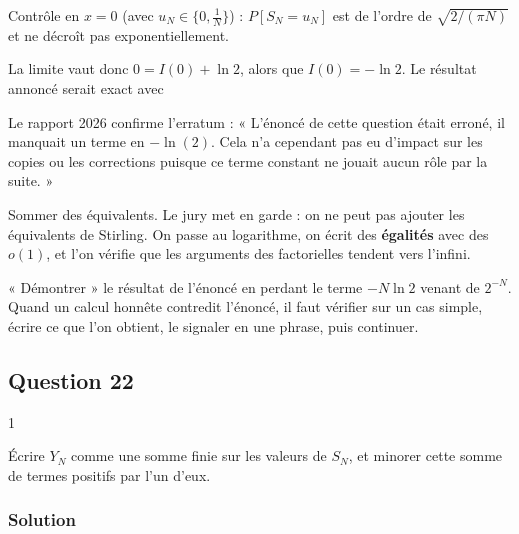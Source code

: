 \documentclass[11pt,a4paper]{article}
\newcommand{\equationajustee}[1]{%
  \sbox{\boiteequation}{$\displaystyle #1$}%
  \ifdim\wd\boiteequation>\linewidth
    \[\resizebox{\linewidth}{!}{\usebox{\boiteequation}}\]%
  \else
    \[#1\]%
  \fi}
\begin{document}
Contrôle en \(x=0\) (avec \(u_N\in\{0,\frac1N\}\)) : \(P[S_N=u_N]\) est de l'ordre de \(\sqrt{2/(\pi N)}\) et ne décroît pas exponentiellement.

La limite vaut donc \(0=I(0)+\ln2\), alors que \(I(0)=-\ln2\). Le résultat annoncé serait exact avec
\equationajustee{J(x)=I(x)+\ln2=\frac{1+x}2\ln(1+x)+\frac{1-x}2\ln(1-x).}

\begin{jury}

Le rapport 2026 confirme l'erratum : « L'énoncé de cette question était erroné, il manquait un terme en \(-\ln(2)\). Cela n'a cependant pas eu d'impact sur les copies ou les corrections puisque ce terme constant ne jouait aucun rôle par la suite. »

\end{jury}

\begin{piege}

Sommer des équivalents. Le jury met en garde : on ne peut pas ajouter les équivalents de Stirling. On passe au logarithme, on écrit des \textbf{égalités} avec des \(o(1)\), et l'on vérifie que les arguments des factorielles tendent vers l'infini.

\end{piege}

\begin{piege}

« Démontrer » le résultat de l'énoncé en perdant le terme \(-N\ln2\) venant de \(2^{-N}\). Quand un calcul honnête contredit l'énoncé, il faut vérifier sur un cas simple, écrire ce que l'on obtient, le signaler en une phrase, puis continuer.

\end{piege}

\hypertarget{question-22}{%
\subsection{Question 22}\label{question-22}}

\begin{indication}{1}

Écrire \(Y_N\) comme une somme finie sur les valeurs de \(S_N\), et minorer cette somme de termes positifs par l'un d'eux.

\end{indication}

\hypertarget{solution-21}{%
\subsubsection{Solution}\label{solution-21}}
\end{document}
